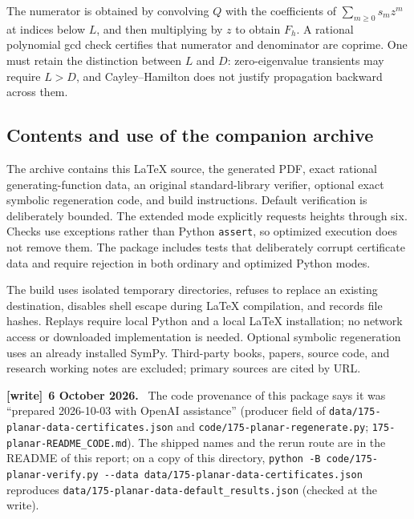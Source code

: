 \documentclass[11pt,letterpaper]{article}
\numberwithin{equation}{section}
\theoremstyle{remark}\newtheorem{remark}[theorem]{Remark}
\newcommand{\file}[1]{\nolinkurl{#1}}
\newenvironment{writenote}[1][]{\par\smallskip\begingroup\small
 \noindent\textbf{[write]}\if\relax\detokenize{#1}\relax\else~\textbf{#1.}\fi\ }%
 {\par\endgroup\smallskip}
\begin{document}
The numerator is obtained by convolving $Q$ with the coefficients of $\sum_{m\ge0}s_mz^m$ at indices below $L$, and then multiplying by $z$ to obtain $F_h$. A rational polynomial gcd check certifies that numerator and denominator are coprime. One must retain the distinction between $L$ and $D$: zero-eigenvalue transients may require $L>D$, and Cayley--Hamilton does not justify propagation backward across them.

\subsection{Contents and use of the companion archive}
The archive contains this \LaTeX{} source, the generated PDF, exact rational generating-function data, an original standard-library verifier, optional exact symbolic regeneration code, and build instructions. Default verification is deliberately bounded. The extended mode explicitly requests heights through six. Checks use exceptions rather than Python \texttt{assert}, so optimized execution does not remove them. The package includes tests that deliberately corrupt certificate data and require rejection in both ordinary and optimized Python modes.

The build uses isolated temporary directories, refuses to replace an existing destination, disables shell escape during \LaTeX{} compilation, and records file hashes. Replays require local Python and a local \LaTeX{} installation; no network access or downloaded implementation is needed. Optional symbolic regeneration uses an already installed SymPy. Third-party books, papers, source code, and research working notes are excluded; primary sources are cited by URL.
\begin{writenote}[6 October 2026]
The code provenance of this package says it was ``prepared 2026-10-03 with OpenAI assistance'' (producer field of \file{data/175-planar-data-certificates.json} and \file{code/175-planar-regenerate.py}; \file{175-planar-README_CODE.md}). The shipped names and the rerun route are in the README of this report; on a copy of this directory, \texttt{python -B code/175-planar-verify.py -{}-data data/175-planar-data-certificates.json} reproduces \file{data/175-planar-data-default_results.json} (checked at the write).
\end{writenote}
\end{document}
